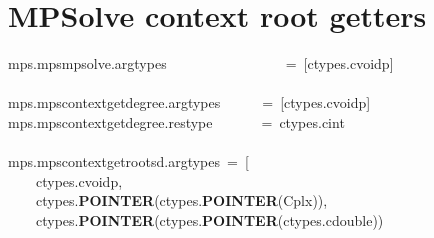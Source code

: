 \documentclass{article}\usepackage[]{graphicx}\usepackage[dvipsnames,table]{xcolor}
\makeatletter
\newcommand{\hlopt}[1]{\textcolor[rgb]{0,0,0}{#1}}%
\newcommand{\hldef}[1]{\textcolor[rgb]{0.345,0.345,0.345}{#1}}%
\newcommand{\hlkwd}[1]{\textcolor[rgb]{0.737,0.353,0.396}{\textbf{#1}}}%
\newenvironment{kframe}{%
 \def\at@end@of@kframe{}%
 \ifinner\ifhmode%
  \def\at@end@of@kframe{\end{minipage}}%
  \begin{minipage}{\columnwidth}%
 \fi\fi%
 \def\FrameCommand##1{\hskip\@totalleftmargin \hskip-\fboxsep
 \colorbox{shadecolor}{##1}\hskip-\fboxsep
     \hskip-\linewidth \hskip-\@totalleftmargin \hskip\columnwidth}%
 \MakeFramed {\advance\hsize-\width
   \@totalleftmargin\z@ \linewidth\hsize
   \@setminipage}}%
 {\par\unskip\endMakeFramed%
 \at@end@of@kframe}
\newenvironment{knitrout}{}{} %
\makeatother
\begin{document}
\section{MPSolve context root getters}
\begin{center}
\begin{minipage}[m]{15cm}
\begin{knitrout}\small
{}\color{fgcolor}\begin{kframe}
\noindent
\ttfamily
\hldef{\textunderscore mps}\hlopt{.}\hldef{mps\textunderscore mpsolve}\hlopt{.}\hldef{argtypes}\hldef{\ \ \ \ \ \ \ \ \ \ \ \ \ \ \ \ \ }\hldef{}\hlopt{=\ {[}}\hldef{ctypes}\hlopt{.}\hldef{c\textunderscore void\textunderscore p}\hlopt{{]}}\hspace*{\fill}\\
\hldef{}\hspace*{\fill}\\
\hldef{\textunderscore mps}\hlopt{.}\hldef{mps\textunderscore context\textunderscore get\textunderscore degree}\hlopt{.}\hldef{argtypes}\hldef{\ \ \ \ \ \ }\hldef{}\hlopt{=\ {[}}\hldef{ctypes}\hlopt{.}\hldef{c\textunderscore void\textunderscore p}\hlopt{{]}}\hspace*{\fill}\\
\hldef{\textunderscore mps}\hlopt{.}\hldef{mps\textunderscore context\textunderscore get\textunderscore degree}\hlopt{.}\hldef{restype}\hldef{\ \ \ \ \ \ \ }\hldef{}\hlopt{=\ }\hldef{ctypes}\hlopt{.}\hldef{c\textunderscore int}\hspace*{\fill}\\
\hldef{}\hspace*{\fill}\\
\hldef{\textunderscore mps}\hlopt{.}\hldef{mps\textunderscore context\textunderscore get\textunderscore roots\textunderscore d}\hlopt{.}\hldef{argtypes\ }\hlopt{=\ {[}}\hspace*{\fill}\\
\hldef{}\hldef{\ \ \ \ }\hldef{ctypes}\hlopt{.}\hldef{c\textunderscore void\textunderscore p}\hlopt{,}\hldef{}\hspace*{\fill}\\
\hldef{}\hldef{\ \ \ \ }\hldef{ctypes}\hlopt{.}\hldef{}\hlkwd{POINTER}\hldef{}\hlopt{(}\hldef{ctypes}\hlopt{.}\hldef{}\hlkwd{POINTER}\hldef{}\hlopt{(}\hldef{Cplx}\hlopt{)),\ }\hldef{}\hspace*{\fill}\\
\hldef{}\hldef{\ \ \ \ }\hldef{ctypes}\hlopt{.}\hldef{}\hlkwd{POINTER}\hldef{}\hlopt{(}\hldef{ctypes}\hlopt{.}\hldef{}\hlkwd{POINTER}\hldef{}\hlopt{(}\hldef{ctypes}\hlopt{.}\hldef{c\textunderscore double}\hlopt{))\ }\hldef{}\hspace*{\fill}\\

\end{kframe}
\end{knitrout}
\end{minipage}
\end{center}
\end{document}
